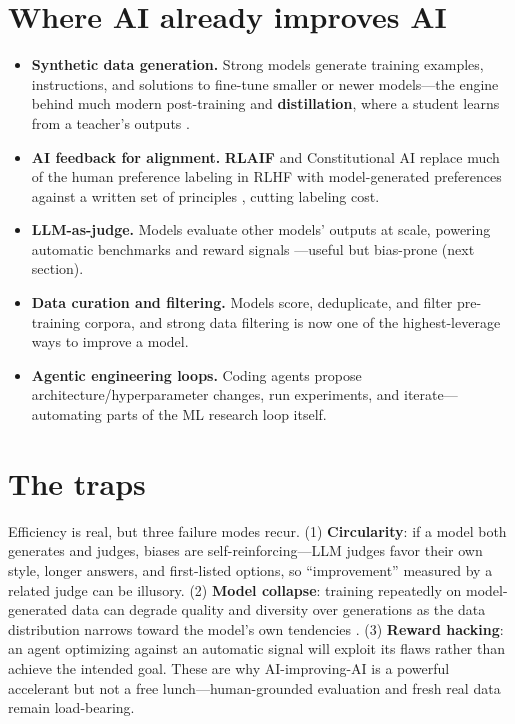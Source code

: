 \documentclass[11pt]{article}
\begin{document}
\section{Where AI already improves AI}
\begin{itemize}[leftmargin=1.4em]
\item \textbf{Synthetic data generation.} Strong models generate training examples, instructions, and
solutions to fine-tune smaller or newer models---the engine behind much modern post-training and
\textbf{distillation}, where a student learns from a teacher's outputs \citep{hinton2015distill}.
\item \textbf{AI feedback for alignment.} \textbf{RLAIF} and Constitutional AI replace much of the human
preference labeling in RLHF with model-generated preferences against a written set of principles
\citep{bai2022constitutional}, cutting labeling cost.
\item \textbf{LLM-as-judge.} Models evaluate other models' outputs at scale, powering automatic
benchmarks and reward signals \citep{zheng2023judge}---useful but bias-prone (next section).
\item \textbf{Data curation and filtering.} Models score, deduplicate, and filter pre-training corpora,
and strong data filtering is now one of the highest-leverage ways to improve a model.
\item \textbf{Agentic engineering loops.} Coding agents propose architecture/hyperparameter changes, run
experiments, and iterate---automating parts of the ML research loop itself.
\end{itemize}

\section{The traps}
Efficiency is real, but three failure modes recur. (1) \textbf{Circularity}: if a model both generates and
judges, biases are self-reinforcing---LLM judges favor their own style, longer answers, and first-listed
options, so ``improvement'' measured by a related judge can be illusory. (2) \textbf{Model collapse}:
training repeatedly on model-generated data can degrade quality and diversity over generations as the data
distribution narrows toward the model's own tendencies \citep{shumailov2024collapse}. (3) \textbf{Reward
hacking}: an agent optimizing against an automatic signal will exploit its flaws rather than achieve the
intended goal. These are why AI-improving-AI is a powerful accelerant but not a free lunch---human-grounded
evaluation and fresh real data remain load-bearing.
\end{document}
